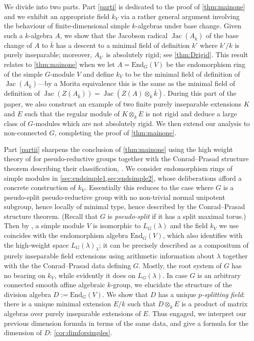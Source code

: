 \documentclass[11pt,reqno]{amsart}
\theoremstyle{definition}
\theoremstyle{remark}
\theoremstyle{definition}
\theoremstyle{plain}
\DeclareMathOperator{\Jac}{Jac}
\newcommand{\End}{\mathrm{End}}
\newcommand{\bark}{{\overline{k}}}
\begin{document}
We divide into two parts. Part \ref{parti} is dedicated to the proof of \cref{thm:mainone} and we exhibit an appropriate field $k_V$ via a rather general argument
involving the behaviour of finite-dimensional simple $k$-algebras under base change.
Given such a $k$-algebra $A$, we show that the Jacobson radical $\Jac(A_\bark)$ of the base change of $A$ to $\bark$ has a descent to a minimal field of definition $k'$ where $k'/k$ is purely inseparable; moreover, $A_{k'}$ is absolutely rigid; see \cref{thm:Drigid}.
This result relates to \cref{thm:mainone} when we let $A=\End_G(V)$ be the endomorphism ring of the simple $G$-module $V$ and define $k_V$ to be the minimal field of definition of $\Jac(A_\bark)$---by a Morita equivalence this is the same as the minimal field of definition of $\Jac(Z(A_\bark))=\Jac(Z(A)\otimes_k\bark)$.
During this part of the paper, we also construct an example of two finite purely inseparable extensions $K$ and $E$ such that the regular module of $K\otimes_k E$ is not rigid and deduce a large class of $G$-modules which are not absolutely rigid.  We then extend our analysis to non-connected $G$, completing the proof of \cref{thm:mainone}.

Part \ref{partii} sharpens the conclusion of \cref{thm:mainone} using the high weight theory of \cite{BS22} for pseudo-reductive groups together with the Conrad--Prasad structure theorem describing their classification, 
\cite[Thm.~9.2.1]{CPClass}. We consider endomorphism rings of simple modules in \cref{sec:endsimple1,sec:endsimple2}, whose deliberations afford a concrete construction of $k_V$.
Essentially this reduces to the case where $G$ is a pseudo-split pseudo-reductive group with no non-trivial normal unipotent subgroup, hence locally of minimal type, hence described by the Conrad--Prasad structure theorem. (Recall that $G$ is \emph{pseudo-split} if it has a split maximal torus.) Then by \cite{BS22}, a simple module $V$ is isomorphic to $L_G(\lambda)$ and the field $k_V$ we use coincides with the endomorphism algebra $\End_G(V)$, which also identifies with the high-weight space $L_G(\lambda)_\lambda$; it can be precisely described as a compositum of purely inseparable field extensions using arithmetic information about $\lambda$ together with the the Conrad--Prasad data defining $G$. Mostly, the root system of $G$ has no bearing on $k_V$, while evidently it does on $L_G(\lambda)$. 
In case $G$ is an arbitrary connected smooth affine algebraic $k$-group, we elucidate the structure of the division algebra $D:=\End_G(V)$. We show that $D$ has a unique \emph{$p$-splitting field}: there is a unique minimal extension $E/k$ such that $D\otimes_k E$ is a product of matrix algebras over purely inseparable extensions of $E$. 
Thus engaged, we interpret our previous dimension formula in terms of the same data, and give a formula for the dimension of $D$: \cref{cor:dimforsimples}.
\end{document}

